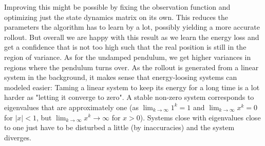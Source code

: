 		Improving this might be possible by fixing the observation function and optimizing just the state dynamics matrix on its own. This reduces the parameters the algorithm has to learn by a lot, possibly yielding a more accurate rollout. But overall we are happy with this result as we learn the energy loss and get a confidence that is not too high such that the real position is still in the region of variance. As for the undamped pendulum, we get higher variances in regions where the pendulum turns over. As the rollout is generated from a linear system in the background, it makes sense that energy-loosing systems can modeled easier: Taming a linear system to keep its energy for a long time is a lot harder as "letting it converge to zero". A stable non-zero system corresponds to eigenvalues that are approximately one (as \( \lim_{k \to \infty} 1^k = 1 \) and \( \lim_{k \to \infty} x^k = 0 \) for \( \lvert x \rvert < 1 \), but \( \lim_{k \to \infty} x^k \to \infty \) for \( x > 0 \)). Systems close with eigenvalues close to one just have to be disturbed a little (\eg by inaccuracies) and the system diverges.

